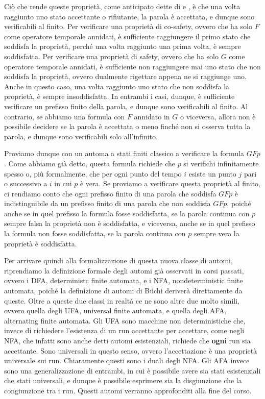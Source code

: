 Ciò che rende queste proprietà, come anticipato dette di  e , è che una volta raggiunto uno stato accettante o rifiutante, la parola è accettata, e dunque sono verificabili al finito. Per verificare una proprietà di co-safety, ovvero che ha solo \(F\) come operatore temporale annidati, è sufficiente raggiungere il primo stato che soddisfa la proprietà, perché una volta raggiunto una prima volta, è sempre soddisfatta. Per verificare una proprietà di safety, ovvero che ha solo \(G\) come operatore temporale annidati, è sufficiente non raggiungere mai uno stato che non soddisfa la proprietà, ovvero dualmente rigettare appena ne si raggiunge uno. Anche in questo caso, una volta raggiunto uno stato che non soddisfa la proprietà, è sempre insoddisfatta. In entrambi i casi, dunque, è sufficiente verificare un prefisso finito della parola, e dunque sono verificabili al finito. Al contrario, se abbiamo una formula con \(F\) annidato in \(G\) o viceversa, allora non è possibile decidere se la parola è accettata o meno finché non si osserva tutta la parola, e dunque sono verificabili solo all'infinito.

Proviamo dunque con un automa a stati finiti classico a verificare la formula \(GF p\). Come abbiamo già detto, questa formula richiede che \(p\) si verifichi infinitamente spesso o, più formalmente, che per ogni punto del tempo \(i\) esiste un punto \(j\) pari o successivo a \(i\) in cui \(p\) è vera. Se proviamo a verificare questa proprietà al finito, ci rendiamo conto che ogni prefisso finito di una parola che soddisfa \(GF p\) è indistinguibile da un prefisso finito di una parola che non soddisfa \(GF p\), poiché anche se in quel prefisso la formula fosse soddisfatta, se la parola continua con \(p\) sempre falsa la proprietà non è soddisfatta, e viceversa, anche se in quel prefisso la formula non fosse soddisfatta, se la parola continua con \(p\) sempre vera la proprietà è soddisfatta.

Per arrivare quindi alla formalizzazione di questa nuova classe di automi, riprendiamo la definizione formale degli automi già osservati in corsi passati, ovvero i DFA, deterministc finite automata, e i NFA, nondeterministic finite automata, poiché la definizione di automi di Büchi deriverà direttamente da queste. Oltre a queste due classi in realtà ce ne sono altre due molto simili, ovvero quella degli UFA, universal finite automata, e quella degli AFA, alternating finite automata. Gli UFA sono macchine non deterministiche che, invece di richiedere l'esistenza di un run accettante per accettare, come negli NFA, che infatti sono anche detti automi esistenziali, richiede che \textbf{ogni} run sia accettante. Sono universali in questo senso, ovvero l'accettazione è una proprietà universale sui run. Chiaramente questi sono i duali degli NFA. Gli AFA invece sono una generalizzazione di entrambi, in cui è possibile avere sia stati esistenziali che stati universali, e dunque è possibile esprimere sia la disgiunzione che la congiunzione tra i run. Questi automi verranno approfonditi alla fine del corso.

